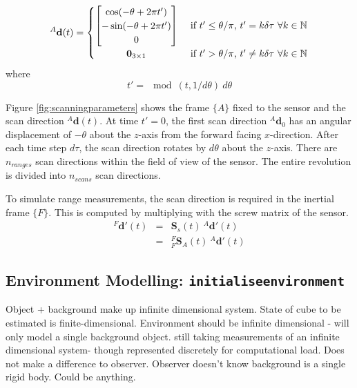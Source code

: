 \begin{equation}
^{A}\mathbf{d}(t) =
	\begin{cases} 
	      \hfill \begin{bmatrix}
	      		\cos(-\theta + 2\pi t') \\
	      		-\sin(-\theta + 2\pi t') \\
	      		0
	      	\end{bmatrix}    \hfill & \text{ if $t' \leq \theta/\pi$, $t' = k\delta\tau$  $\forall k \in \mathbb{N}$} \\
	      \hfill \mathbf{0}_{3 \times 1} \hfill & \text{ if $t' > \theta/\pi$, $t' \neq k\delta\tau$  $\forall k \in \mathbb{N}$} \\
	\end{cases} 
\end{equation}
where
\begin{equation}
t' = \mod(t,1/d\theta)\:d\theta
\end{equation}

Figure \ref{fig:scanningparameters} shows the frame $\{A\}$ fixed to the sensor and the scan direction ${^{A}\mathbf{d}(t)}$. At time $t' = 0$, the first scan direction ${^{A}\mathbf{d}_0}$ has an angular displacement of $-\theta$ about the $z$-axis from the forward facing $x$-direction. After each time step $d\tau$, the scan direction rotates by $d\theta$ about the $z$-axis. There are $n_{ranges}$ scan directions within the field of view of the sensor. The entire revolution is divided into $n_{scans}$ scan directions.


To simulate range measurements, the scan direction is required in the inertial frame $\{F\}$. This is computed by multiplying with the screw matrix of the sensor.
\begin{equation}
	\begin{array}{lcl}
	{^{F}\mathbf{d'}(t)} & = & \mathbf{S}_s(t)\:{^{A}\mathbf{d'}(t)} \\
	& = & {^{F}_{F}\mathbf{S}^{}_{A}(t)}\:{^{A}\mathbf{d'}(t)}
	\end{array}
\end{equation}

\subsection{Environment Modelling: \texttt{initialiseenvironment}}
Object + background make up infinite dimensional system. State of cube to be estimated is finite-dimensional.
Environment should be infinite dimensional - will only model a single background object.
still taking measurements of an infinite dimensional system- though represented discretely for computational load. Does not make a difference to observer. Observer doesn't know background is a single rigid body. Could be anything.

